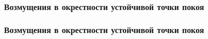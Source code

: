 \documentclass[slidestop,compress,mathserif]{beamer}
\begin{document}
\begin{frame}
\frametitle{Возмущения в окрестности устойчивой точки покоя}
\begin{figure}[h!]
\vspace{-1em}
\vspace{-2em}
\end{figure}
\end{frame}
\begin{frame}
\frametitle{Возмущения в окрестности устойчивой точки покоя}
\begin{figure}[h!]
\vspace{-1em}
\vspace{-2em}
\end{figure}
\end{frame}
\end{document}

